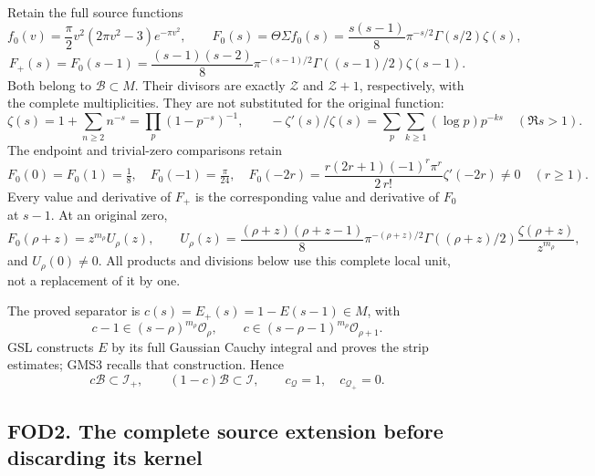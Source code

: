 Retain the full source functions \[
 f_0(v)=\frac{\pi}{2}v^2(2\pi v^2-3)e^{-\pi v^2},\qquad
 F_0(s)=\Theta\Sigma f_0(s)
 =\frac{s(s-1)}8\pi^{-s/2}\Gamma(s/2)\zeta(s),
\] \[
 F_+(s)=F_0(s-1)
 =\frac{(s-1)(s-2)}8\pi^{-(s-1)/2}\Gamma((s-1)/2)\zeta(s-1).
\tag{FOD1.5}
\] Both belong to \(\mathcal B\subset M\). Their divisors are exactly
\(\mathscr Z\) and \(\mathscr Z+1\), respectively, with the complete
multiplicities. They are not substituted for the original function: \[
\zeta(s)=1+\sum_{n\ge2}n^{-s}=\prod_p(1-p^{-s})^{-1},\qquad
-\zeta'(s)/\zeta(s)=\sum_p\sum_{k\ge1}(\log p)p^{-ks}
\quad(\Re s>1).
\tag{FOD1.6}
\] The endpoint and trivial-zero comparisons retain \[
F_0(0)=F_0(1)=\tfrac18,\quad F_0(-1)=\tfrac{\pi}{24},\quad
F_0(-2r)=\frac{r(2r+1)(-1)^r\pi^r}{2\,r!}\zeta'(-2r)\ne0\quad(r\ge1).
\tag{FOD1.7}
\] Every value and derivative of \(F_+\) is the corresponding value and
derivative of \(F_0\) at \(s-1\). At an original zero, \[
F_0(\rho+z)=z^{m_\rho}U_\rho(z),\qquad
U_\rho(z)=\frac{(\rho+z)(\rho+z-1)}8
 \pi^{-(\rho+z)/2}\Gamma((\rho+z)/2)
 \frac{\zeta(\rho+z)}{z^{m_\rho}},
\tag{FOD1.8}
\] and \(U_\rho(0)\ne0\). All products and divisions below use this
complete local unit, not a replacement of it by one.

The proved separator is \(c(s)=E_+(s)=1-E(s-1)\in M\), with \[
c-1\in(s-\rho)^{m_\rho}\mathcal O_\rho,\qquad
c\in(s-\rho-1)^{m_\rho}\mathcal O_{\rho+1}.
\tag{FOD1.9}
\] GSL constructs \(E\) by its full Gaussian Cauchy integral and proves
the strip estimates; GMS3 recalls that construction. Hence \[
c\mathcal B\subset\mathcal I_+,\qquad
(1-c)\mathcal B\subset\mathcal I,\qquad
c_{\mathcal Q}=1,\quad c_{\mathcal Q_+}=0.
\tag{FOD1.10}
\]

\subsection{FOD2. The complete source extension before discarding its
kernel}\label{fod2.-the-complete-source-extension-before-discarding-its-kernel}

